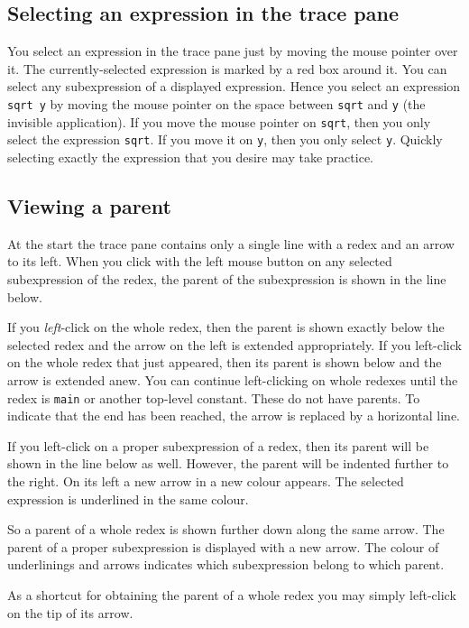 \documentclass[12pt]{article}
\begin{document}
\subsection{Selecting an expression in the trace pane}

You select an expression in the trace pane just by moving the mouse pointer over it. The currently-selected expression is marked by a red box around it. You can select any subexpression of a displayed expression. Hence you select an expression \texttt{sqrt y} by moving the mouse pointer on the space between \texttt{sqrt} and \texttt{y} (the invisible application). If you move the mouse pointer on \texttt{sqrt}, then you only select the expression \texttt{sqrt}. If you move it on \texttt{y}, then you only select \texttt{y}.
Quickly selecting exactly the expression that you desire may take practice.

\subsection{Viewing a parent}

At the start the trace pane contains only a single line with a redex and an arrow to its left. When you click with the left mouse button on any selected subexpression of the redex, the parent of the subexpression is shown in the line below.

If you \emph{left}-click on the whole redex, then the parent is shown exactly below the selected redex and the arrow on the left is extended appropriately. If you left-click on the whole redex that just appeared, then its parent is shown below and the arrow is extended anew. You can continue left-clicking on whole redexes until the redex is \texttt{main} or another top-level constant. These do not have parents. To indicate that the end has been reached, the arrow is replaced by a horizontal line.

If you left-click on a proper subexpression of a redex, then its parent will be shown in the line below as well. However, the parent will be indented further to the right. On its left a new arrow in a new colour appears. The selected expression is underlined in the same colour. 

So a parent of a whole redex is shown further down along the same arrow.
The parent of a proper subexpression is displayed with a new arrow. The colour of underlinings and arrows indicates which subexpression belong to which parent. 

As a shortcut for obtaining the parent of a whole redex you may simply left-click on the tip of its arrow.
\end{document}
